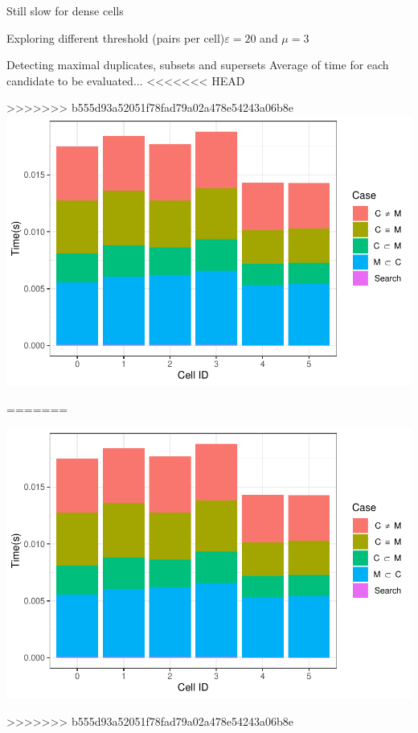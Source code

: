 \documentclass{beamer}
\begin{document}
\begin{frame}{Still slow for dense cells}
\begin{frame}{Exploring different threshold (pairs per cell)}{$\varepsilon=20$ and $\mu=3$}
\begin{frame}{Detecting maximal duplicates, subsets and supersets}
        {Average of time for each candidate to be evaluated...}
        \centering
<<<<<<< HEAD
        \begin{minipage}{0.49\textwidth}
>>>>>>> b555d93a52051f78fad79a02a478e54243a06b8e
                \includegraphics[width=\textwidth]{figures/Maximals/performanceByMean1}
        \end{minipage} %
        \begin{minipage}{0.49\textwidth}
=======
        \begin{minipage}{0.49\textwidth}
                \includegraphics[width=\textwidth]{figures/Maximals/performanceByMean1}
        \end{minipage} %
        \begin{minipage}{0.49\textwidth}
>>>>>>> b555d93a52051f78fad79a02a478e54243a06b8e

\end{minipage}
\end{minipage}
\end{frame}
\end{frame}
\end{frame}
\end{document}
